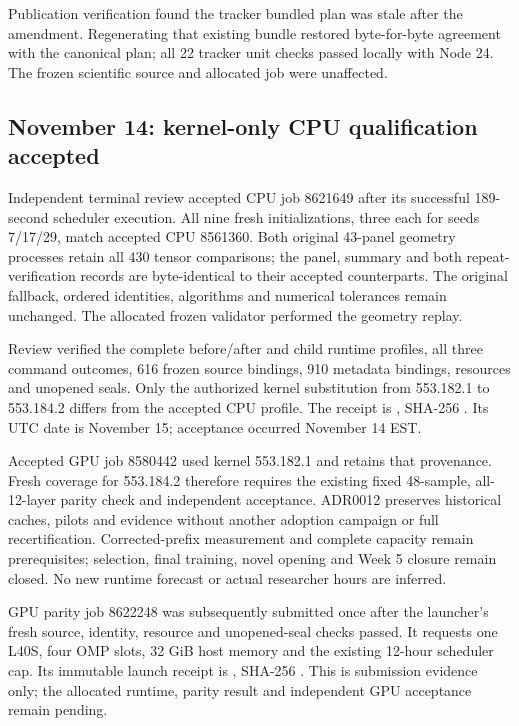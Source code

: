 Publication verification found the tracker bundled plan was stale after the
amendment. Regenerating that existing bundle restored byte-for-byte agreement
with the canonical plan; all 22 tracker unit checks passed locally with Node 24.
The frozen scientific source and allocated job were unaffected.

\subsection*{November 14: kernel-only CPU qualification accepted}

Independent terminal review accepted CPU job 8621649 after its successful
189-second scheduler execution. All nine fresh initializations, three each for
seeds 7/17/29, match accepted CPU 8561360. Both original 43-panel geometry
processes retain all 430 tensor comparisons; the panel, summary and both
repeat-verification records are byte-identical to their accepted counterparts.
The original fallback, ordered identities, algorithms and numerical tolerances
remain unchanged. The allocated frozen validator performed the geometry replay.

Review verified the complete before/after and child runtime profiles, all three
command outcomes, 616 frozen source bindings, 910 metadata bindings, resources
and unopened seals. Only the authorized kernel substitution from 553.182.1 to
553.184.2 differs from the accepted CPU profile. The receipt is
,
SHA-256
.
Its UTC date is November 15; acceptance occurred November 14 EST.

Accepted GPU job 8580442 used kernel 553.182.1 and retains that provenance.
Fresh coverage for 553.184.2 therefore requires the existing fixed 48-sample,
all-12-layer parity check and independent acceptance. ADR0012 preserves
historical caches, pilots and evidence without another adoption campaign or
full recertification. Corrected-prefix measurement and complete capacity remain
prerequisites; selection, final training, novel opening and Week 5 closure remain
closed. No new runtime forecast or actual researcher hours are inferred.

GPU parity job 8622248 was subsequently submitted once after the launcher's
fresh source, identity, resource and unopened-seal checks passed. It requests
one L40S, four OMP slots, 32 GiB host memory and the existing 12-hour scheduler
cap. Its immutable launch receipt is
,
SHA-256
.
This is submission evidence only; the allocated runtime, parity result and
independent GPU acceptance remain pending.


